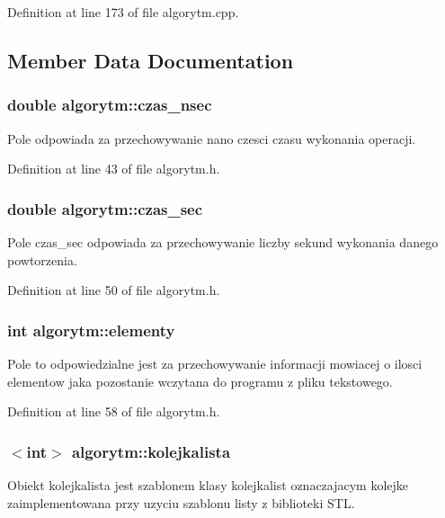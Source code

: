 Definition at line 173 of file algorytm.\-cpp.



\subsection{Member Data Documentation}
\hypertarget{classalgorytm_a3d448d22ae50bd472f6daadd7bd24670}{
\subsubsection[{czas\-\_\-nsec}]{\setlength{\rightskip}{0pt plus 5cm}double algorytm\-::czas\-\_\-nsec}}\label{classalgorytm_a3d448d22ae50bd472f6daadd7bd24670}
Pole odpowiada za przechowywanie nano czesci czasu wykonania operacji. 

Definition at line 43 of file algorytm.\-h.

\hypertarget{classalgorytm_a8e8e89b83e539607b01b5a33f8203d27}{
\subsubsection[{czas\-\_\-sec}]{\setlength{\rightskip}{0pt plus 5cm}double algorytm\-::czas\-\_\-sec}}\label{classalgorytm_a8e8e89b83e539607b01b5a33f8203d27}
Pole czas\-\_\-sec odpowiada za przechowywanie liczby sekund wykonania danego powtorzenia. 

Definition at line 50 of file algorytm.\-h.

\hypertarget{classalgorytm_aa8284a41958410778215e08dc305f409}{
\subsubsection[{elementy}]{\setlength{\rightskip}{0pt plus 5cm}int algorytm\-::elementy}}\label{classalgorytm_aa8284a41958410778215e08dc305f409}
Pole to odpowiedzialne jest za przechowywanie informacji mowiacej o ilosci elementow jaka pozostanie wczytana do programu z pliku tekstowego. 

Definition at line 58 of file algorytm.\-h.

\hypertarget{classalgorytm_a88d3998fb7af950b9bebe97898b7ab7a}{
\subsubsection[{kolejkalista}]{$<$int$>$ algorytm\-::kolejkalista}}\label{classalgorytm_a88d3998fb7af950b9bebe97898b7ab7a}
Obiekt kolejkalista jest szablonem klasy kolejkalist oznaczajacym kolejke zaimplementowana przy uzyciu szablonu listy z biblioteki S\-T\-L. 

